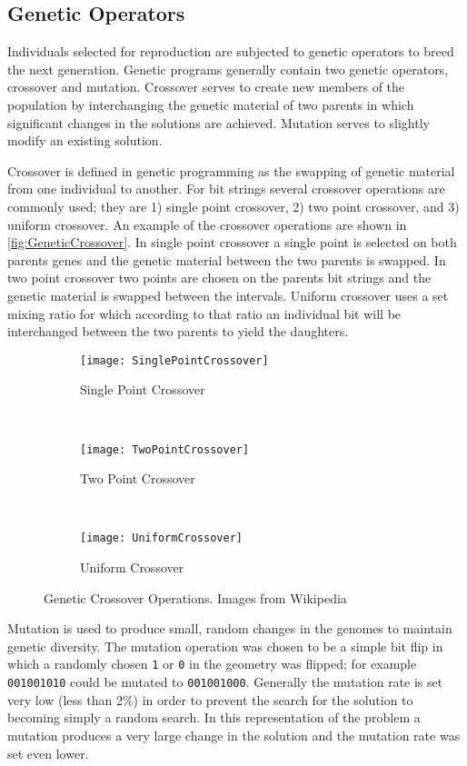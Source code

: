 \subsection{Genetic Operators}
Individuals selected for reproduction are subjected to genetic operators to breed the next generation. 
Genetic programs generally contain two genetic operators, crossover and mutation. 
Crossover serves to create new members of the population by interchanging the genetic material of two parents in which significant changes in the solutions are achieved. 
Mutation serves to slightly modify an existing solution. 

Crossover is defined in genetic programming as the swapping of genetic material from one individual to another.  
For bit strings several crossover operations are commonly used; they are 1) single point crossover, 2) two point crossover, and 3) uniform crossover.
An example of the crossover operations are shown in \autoref{fig:GeneticCrossover}.
In single point crossover a single point is selected on both parents genes and the genetic material between the two parents is swapped.
In two point crossover two points are chosen on the parents bit strings and the genetic material is swapped between the intervals.
Uniform crossover uses a set mixing ratio for which according to that ratio an individual bit will be interchanged between the two parents to yield the daughters.
\begin{figure}
  \begin{subfigure}[b]{0.3\textwidth}
    \texttt{[image: SinglePointCrossover]}
    \caption{Single Point Crossover}
  \end{subfigure}
  ~
  \begin{subfigure}[b]{0.3\textwidth}
    \texttt{[image: TwoPointCrossover]}
    \caption{Two Point Crossover}
  \end{subfigure}
  ~
  \begin{subfigure}[b]{0.3\textwidth}
    \texttt{[image: UniformCrossover]}
    \caption{Uniform Crossover}
  \end{subfigure}
  \caption[Genetic Crossover Operations]{Genetic Crossover Operations. Images from Wikipedia}
  \label{fig:GeneticCrossover}
\end{figure}

Mutation is used to produce small, random changes in the genomes to maintain genetic diversity.
The mutation operation was chosen to be a simple bit flip in which a randomly chosen \verb+1+ or \verb+0+ in the geometry was flipped; for example \verb+001001010+ could be mutated to \verb+001001000+.
Generally the mutation rate is set very low (less than 2\%) in order to prevent the search for the solution to becoming simply a random search.
In this representation of the problem a mutation produces a very large change in the solution and the mutation rate was set even lower.

